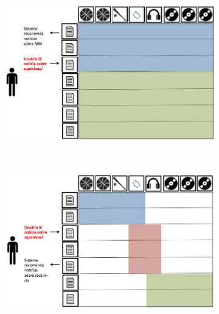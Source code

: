 \documentclass[
    12pt,                %
    oneside,            %
    a4paper,            %
    english,            %
    brazil                %
    ]{abntex2ppgsi}
\begin{document}
\begin{figure} [htpb]
\centering
 \caption{
        Representação de uma aplicação de mineração de dados implementado a partir de análise de agrupamento com similaridade total (a) e similaridade parcial (b,c,d). Os grupos são diferenciados por cores.
    }
    \begin{subfigure}[b]{0.45\textwidth}
        \includegraphics[width=\textwidth]{img/sistema0.png}
        \caption{}
        \label{fig:sistema:a}
    \end{subfigure}
    ~
    \begin{subfigure}[b]{0.45\textwidth}
        \includegraphics[width=\textwidth]{img/sistema1.png}
        \caption{}
        \label{fig:sistema:b}
    \end{subfigure}
    ~
    \begin{subfigure}[b]{0.45\textwidth}

\end{subfigure}
\end{figure}
\end{document}
